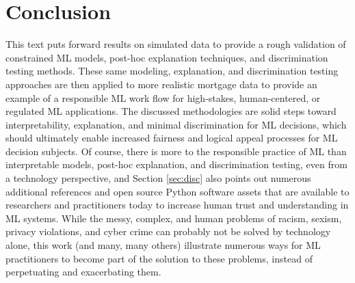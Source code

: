 \documentclass[information,article,submit,moreauthors,pdftex]{definitions/mdpi}
\begin{document}
\section{Conclusion}\label{sec:con}

This text puts forward results on simulated data to provide a rough validation of constrained ML models, post-hoc explanation techniques, and discrimination testing methods. These same modeling, explanation, and discrimination testing approaches are then applied to more realistic mortgage data to provide an example of a responsible ML work flow for high-stakes, human-centered, or regulated ML applications. The discussed methodologies are solid steps toward interpretability, explanation, and minimal discrimination for ML decisions, which should ultimately enable increased fairness and logical appeal processes for ML decision subjects. Of course, there is more to the responsible practice of ML than interpretable models, post-hoc explanation, and discrimination testing, even from a technology perspective, and Section \ref{sec:disc} also points out numerous additional references and open source Python software assets that are available to researchers and practitioners today to increase human trust and understanding in ML systems. While the messy, complex, and human problems of racism, sexism, privacy violations, and cyber crime can probably not be solved by technology alone, this work (and many, many others) illustrate numerous ways for ML practitioners to become part of the solution to these problems, instead of perpetuating and exacerbating them. 

\end{document}
